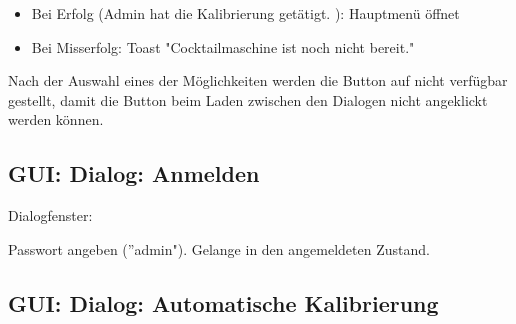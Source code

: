 {\begin{itemize}
\begin{itemize}
	\item Bei Erfolg (Admin hat die Kalibrierung getätigt. ): Hauptmenü öffnet
	
	\item Bei Misserfolg: Toast "Cocktailmaschine ist noch nicht bereit."

\end{itemize}
\end{itemize}


Nach der Auswahl eines der Möglichkeiten werden die Button auf nicht verfügbar gestellt, damit die Button beim Laden zwischen den Dialogen nicht angeklickt werden können.

\subsection{GUI: Dialog: Anmelden}

Dialogfenster:

Passwort angeben (''admin"). Gelange in den angemeldeten Zustand.

\subsection{GUI: Dialog: Automatische Kalibrierung}

}
